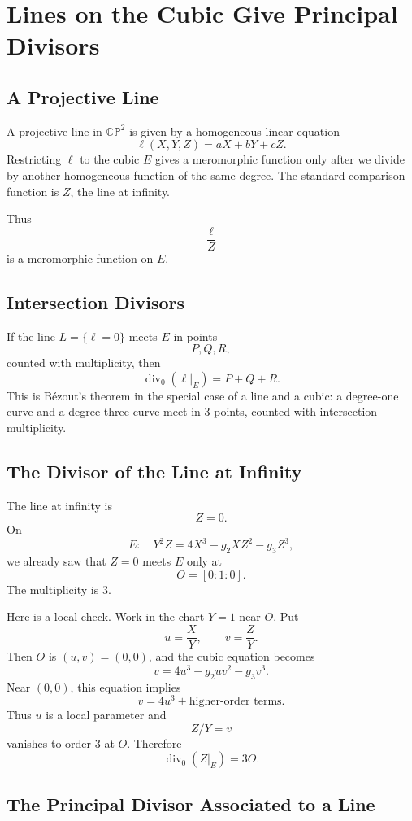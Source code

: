 \documentclass[11pt]{article}
\newcommand{\CP}{\mathbb{CP}}
\newcommand{\divisor}{\operatorname{div}}
\begin{document}
\section{Lines on the Cubic Give Principal Divisors}

\subsection{A Projective Line}

A projective line in \(\CP^2\) is given by a homogeneous linear equation
\[
\ell(X,Y,Z)=aX+bY+cZ.
\]
Restricting \(\ell\) to the cubic \(E\) gives a meromorphic function only
after we divide by another homogeneous function of the same degree.  The
standard comparison function is \(Z\), the line at infinity.

Thus
\[
\frac{\ell}{Z}
\]
is a meromorphic function on \(E\).

\subsection{Intersection Divisors}

If the line \(L=\{\ell=0\}\) meets \(E\) in points
\[
P,Q,R,
\]
counted with multiplicity, then
\[
\divisor_0(\ell|_E)=P+Q+R.
\]
This is B\'ezout's theorem in the special case of a line and a cubic: a
degree-one curve and a degree-three curve meet in \(3\) points, counted with
intersection multiplicity.

\subsection{The Divisor of the Line at Infinity}

The line at infinity is
\[
Z=0.
\]
On
\[
E:\quad Y^2Z=4X^3-g_2XZ^2-g_3Z^3,
\]
we already saw that \(Z=0\) meets \(E\) only at
\[
O=[0:1:0].
\]
The multiplicity is \(3\).

Here is a local check.  Work in the chart \(Y=1\) near \(O\).  Put
\[
u=\frac{X}{Y},
\qquad
v=\frac{Z}{Y}.
\]
Then \(O\) is \((u,v)=(0,0)\), and the cubic equation becomes
\[
v=4u^3-g_2uv^2-g_3v^3.
\]
Near \((0,0)\), this equation implies
\[
v=4u^3+\text{higher-order terms}.
\]
Thus \(u\) is a local parameter and
\[
Z/Y=v
\]
vanishes to order \(3\) at \(O\).  Therefore
\[
\divisor_0(Z|_E)=3O.
\]

\subsection{The Principal Divisor Associated to a Line}
\end{document}
